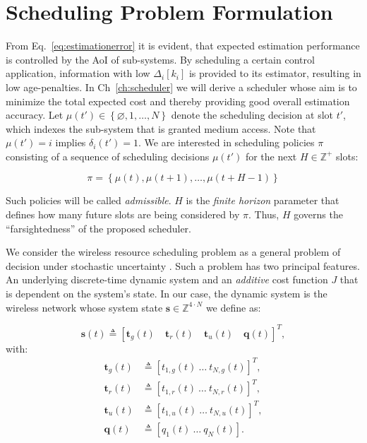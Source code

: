 \section{Scheduling Problem Formulation} \label{sec:problem} 

From Eq.~\eqref{eq:estimationerror} it is evident, that expected estimation
performance is controlled by the AoI of sub-systems. By scheduling a certain
control application, information with low $\Delta_i[k_i]$ is provided to its
estimator, resulting in low age-penalties. In Ch~\ref{ch:scheduler} we will
derive a scheduler whose aim is to minimize the total expected cost and thereby
providing good overall estimation accuracy. Let $\mu(t')\in\left\{\varnothing,
1, \dots,N \right\}$ denote the scheduling decision at slot $t'$, which indexes
the sub-system that is granted medium access. Note that $\mu(t')=i$ implies
$\delta_i(t')=1$. We are interested in scheduling policies $\pi$ consisting of a
sequence of scheduling decisions $\mu(t')$ for the next $H \in \mathbb{Z}^+$
slots:

\begin{equation}
  \pi=\left\{ \mu(t), \mu(t+1), \dots, \mu(t+H-1) \right\}
\end{equation}

Such policies will be called \textit{admissible}. $H$ is the \textit{finite
horizon} parameter that defines how many future slots are being considered by
$\pi$. Thus, $H$ governs the ``farsightedness'' of the proposed scheduler.

We consider the wireless resource scheduling problem as a general problem of
decision under stochastic uncertainty \cite{bertsekas1995dynamic}. Such a
problem has two principal features. An underlying discrete-time dynamic system
and an \textit{additive} cost function $J$ that is dependent on the system's
state. In our case, the dynamic system is the wireless network whose system
state $\boldsymbol{s} \in \mathbb{Z}^{4\cdot N}$ we define as:

\begin{equation}
  \boldsymbol{s}(t) \triangleq \left[\boldsymbol{t}_g(t) \quad \boldsymbol{t}_r(t) \quad \boldsymbol{t}_u(t) \quad \boldsymbol{q}(t)\right]^T, 
\end{equation}   
with: 
\begin{align}
  \boldsymbol{t}_g(t) &\triangleq \left[ t_{1,g}(t) ~ \dots ~ t_{N,g}(t) \right]^T ,\\
  \boldsymbol{t}_r(t) &\triangleq \left[ t_{1,r}(t) ~ \dots ~ t_{N,r}(t) \right]^T ,\\
  \boldsymbol{t}_u(t) &\triangleq \left[ t_{1,u}(t) ~ \dots ~ t_{N,u}(t) \right]^T ,\\
  \boldsymbol{q}(t) &\triangleq \left[ q_1(t) ~ \dots ~ q_N(t) \right].
\end{align}  

